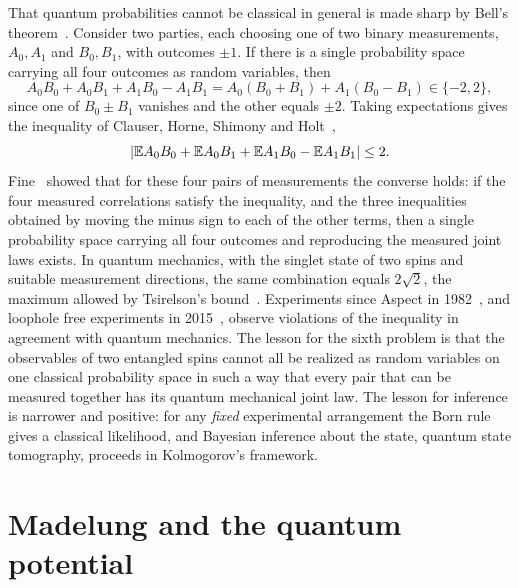 That quantum probabilities cannot be classical in general is made sharp by Bell's theorem~\cite{bell1964}. Consider two parties, each choosing one of two binary measurements, $A_0,A_1$ and $B_0,B_1$, with outcomes $\pm1$. If there is a single probability space carrying all four outcomes as random variables, then
\[
A_0B_0+A_0B_1+A_1B_0-A_1B_1 = A_0(B_0+B_1)+A_1(B_0-B_1)\in\{-2,2\},
\]
since one of $B_0\pm B_1$ vanishes and the other equals $\pm2$. Taking expectations gives the inequality of Clauser, Horne, Shimony and Holt~\cite{clauser1969},
\[
|\mathbb{E} A_0B_0+\mathbb{E} A_0B_1+\mathbb{E} A_1B_0-\mathbb{E} A_1B_1|\leq2.
\]
Fine~\cite{fine1982} showed that for these four pairs of measurements the converse holds: if the four measured correlations satisfy the inequality, and the three inequalities obtained by moving the minus sign to each of the other terms, then a single probability space carrying all four outcomes and reproducing the measured joint laws exists. In quantum mechanics, with the singlet state of two spins and suitable measurement directions, the same combination equals $2\sqrt2$, the maximum allowed by Tsirelson's bound~\cite{tsirelson1980}. Experiments since Aspect in 1982~\cite{aspect1982}, and loophole free experiments in 2015~\cite{hensen2015,giustina2015,shalm2015}, observe violations of the inequality in agreement with quantum mechanics. The lesson for the sixth problem is that the observables of two entangled spins cannot all be realized as random variables on one classical probability space in such a way that every pair that can be measured together has its quantum mechanical joint law. The lesson for inference is narrower and positive: for any \emph{fixed} experimental arrangement the Born rule gives a classical likelihood, and Bayesian inference about the state, quantum state tomography, proceeds in Kolmogorov's framework.

\section{Madelung and the quantum potential}\label{sec:madelung}


